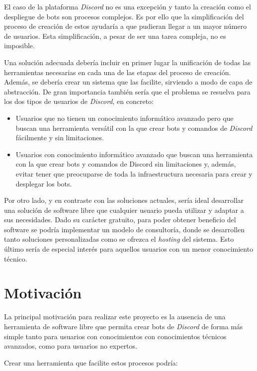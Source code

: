 El caso de la plataforma \textit{Discord} no es una excepción y tanto la creación como el despliegue de bots son procesos complejos. Es por ello que la simplificación del proceso de creación de estos ayudaría a que pudieran llegar a un mayor número de usuarios. Esta simplificación, a pesar de ser una tarea compleja, no es imposible.

Una solución adecuada debería incluir en primer lugar la unificación de todas las herramientas necesarias en cada una de las etapas del proceso de creación. Además, se debería crear un sistema que las facilite, sirviendo a modo de capa de abstracción. De gran importancia también sería que el problema se resuelva para los dos tipos de usuarios de \textit{Discord}, en concreto:

\begin{itemize}
	\item Usuarios que no tienen un conocimiento informático avanzado pero que buscan una herramienta versátil con la que crear bots y comandos de \textit{Discord} fácilmente y sin limitaciones.
	\item Usuarios con conocimiento informático avanzado que buscan una herramienta con la que crear bots y comandos de Discord sin limitaciones y, además, evitar tener que preocuparse de toda la infraestructura necesaria para crear y desplegar los bots.
\end{itemize}

Por otro lado, y en contraste con las soluciones actuales, sería ideal desarrollar una solución de software libre que cualquier usuario pueda utilizar y adaptar a sus necesidades. Dado su carácter gratuito, para poder obtener beneficio del software se podría implementar un modelo de consultoría, donde se desarrollen tanto soluciones personalizadas como se ofrezca el \textit{hosting} del sistema. Esto último sería de especial interés para aquellos usuarios con un menor conocimiento técnico.



\section{Motivación}

La principal motivación para realizar este proyecto es la ausencia de una herramienta de software libre que permita crear bots de \textit{Discord} de forma más simple tanto para usuarios con conocimientos con conocimientos técnicos avanzados, como para usuarios no expertos.

Crear una herramienta que facilite estos procesos podría:

